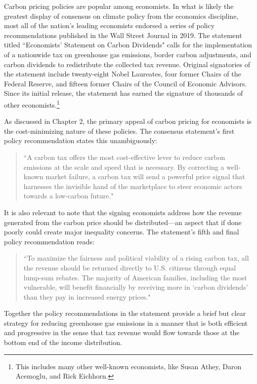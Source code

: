 Carbon pricing policies are popular among economists. In what is likely the greatest display of consensus on climate policy from the economics discipline, most all of the nation's leading economists endorsed a series of policy recommendations published in the Wall Street Journal in 2019. The statement titled ``Economists' Statement on Carbon Dividends" calls for the implementation of a nationwide tax on greenhouse gas emissions, border carbon adjustments, and carbon dividends to redistribute the collected tax revenue. Original signatories of the statement include twenty-eight Nobel Laureates, four former Chairs of the Federal Reserve, and fifteen former Chairs of the Council of Economic Advisors. Since its initial release, the statement has earned the signature of thousands of other economists.\footnote{This includes many other well-known economists, like Susan Athey, Daron Acemoglu, and Rick Eichhorn.}

As discussed in Chapter 2, the primary appeal of carbon pricing for economists is the cost-minimizing nature of these policies. The consensus statement's first policy recommendation states this unambiguously:
\begin{quote}\singlespacing
    ``A carbon tax offers the most cost-effective lever to reduce carbon emissions at the scale and speed that is necessary. By correcting a well-known market failure, a carbon tax will send a powerful price signal that harnesses the invisible hand of the marketplace to steer economic actors towards a low-carbon future." 
\end{quote}
It is also relevant to note that the signing economists address how the revenue generated from the carbon price should be distributed---an aspect that if done poorly could create major inequality concerns. The statement's fifth and final policy recommendation reads: 
\begin{quote}\singlespacing
    ``To maximize the fairness and political viability of a rising carbon tax, all the revenue should be returned directly to U.S. citizens through equal lump-sum rebates. The majority of American families, including the most vulnerable, will benefit financially by receiving more in `carbon dividends' than they pay in increased energy prices."
\end{quote}
Together the policy recommendations in the statement provide a brief but clear strategy for reducing greenhouse gas emissions in a manner that is both efficient and progressive in the sense that tax revenue would flow towards those at the bottom end of the income distribution. 

